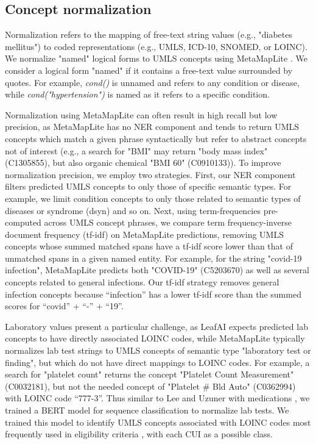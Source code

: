 \documentclass[../main.tex]{subfiles}
\begin{document}
\subsection{Concept normalization}

Normalization refers to the mapping of free-text string values (e.g., "diabetes mellitus") to coded representations (e.g., UMLS, ICD-10, SNOMED, or LOINC). We normalize "named" logical forms to UMLS concepts using MetaMapLite \cite{aronson2001effective, demner2017metamap}. We consider a logical form "named" if it contains a free-text value surrounded by quotes. For example, \textit{cond()} is unnamed and refers to any condition or disease, while \textit{cond("hypertension")} is named as it refers to a specific condition. 

Normalization using MetaMapLite can often result in high recall but low precision, as MetaMapLite has no NER component and tends to return UMLS concepts which match a given phrase syntactically but refer to abstract concepts not of interest (e.g., a search for "BMI" may return "body mass index" (C1305855), but also organic chemical "BMI 60" (C0910133)). To improve normalization precision, we employ two strategies. First, our NER component filters predicted UMLS concepts to only those of specific semantic types. For example, we limit condition concepts to only those related to semantic types of diseases or syndrome (dsyn) and so on. Next, using term-frequencies pre-computed across UMLS concept phrases, we compare term frequency-inverse document frequency (tf-idf) on MetaMapLite predictions, removing UMLS concepts whose summed matched spans have a tf-idf score lower than that of unmatched spans in a given named entity. For example, for the string "covid-19 infection", MetaMapLite predicts both "COVID-19" (C5203670) as well as several concepts related to general infections. Our tf-idf strategy removes general infection concepts because “infection” has a lower tf-idf score than the summed scores for “covid” + “-” + “19”. 

Laboratory values present a particular challenge, as LeafAI expects predicted lab concepts to have directly associated LOINC codes, while MetaMapLite typically normalizes lab test strings to UMLS concepts of semantic type "laboratory test or finding", but which do not have direct mappings to LOINC codes. For example, a search for "platelet count" returns the concept "Platelet Count Measurement" (C0032181), but not the needed concept of "Platelet \# Bld Auto" (C0362994) with LOINC code “777-3”. Thus similar to Lee and Uzuner with medications \cite{lee2020normalizing}, we trained a BERT model for sequence classification to normalize lab tests. We trained this model to identify UMLS concepts associated with LOINC codes most frequently used in eligibility criteria \cite{rafee2022elapro}, with each CUI as a possible class.
\end{document}
